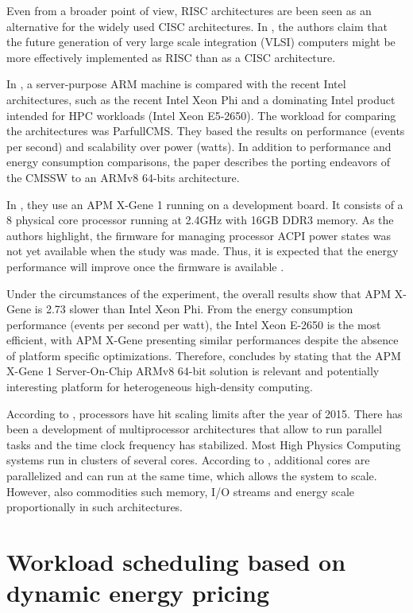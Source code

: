 Even from a broader point of view, RISC architectures are been seen as an alternative for the widely used CISC architectures. In \cite{RISC_CASE}, the authors claim that the future generation of very large scale integration (VLSI) computers might be more effectively implemented as RISC than as a CISC architecture.

In \cite{ACAT14ARMDAVID}, a server-purpose ARM machine is compared with the recent
Intel architectures, such as the recent Intel Xeon Phi and a dominating Intel product
intended for HPC workloads (Intel Xeon E5-2650). The workload for comparing
the architectures was ParfullCMS. They based the results on performance (events per
second) and scalability over power (watts). In addition to performance and energy
consumption comparisons, the paper describes the porting endeavors of the CMSSW to
an ARMv8 64-bits architecture.

In \cite{ACAT14ARMDAVID}, they use an APM X-Gene 1 running on a development board. 
It consists of a 8 physical core processor running at 2.4GHz with 16GB DDR3 memory.
As the authors highlight, the firmware for managing processor ACPI power states was
not yet available when the study was made. Thus, it is expected that the energy 
performance will improve once the firmware is available \cite{ACAT14ARMDAVID}.

Under the circumstances of the experiment, the overall results show that APM X-Gene 
is 2.73 slower than Intel Xeon Phi. From the energy consumption performance (events
per second per watt), the Intel Xeon E-2650 is the most efficient, with APM X-Gene
presenting similar performances despite the absence of platform specific 
optimizations. Therefore, \cite{ACAT14ARMDAVID} concludes by stating that the APM
X-Gene 1 Server-On-Chip ARMv8 64-bit solution is relevant and potentially interesting
platform for heterogeneous high-density computing. 

According to \cite{ACAT13ARM}, processors have hit scaling limits after the year of 2015. There has been a development of multiprocessor architectures that
allow to run parallel tasks and the time clock frequency has stabilized. Most High Physics Computing systems run in clusters of several cores. According to \cite{ACAT13ARM}, additional cores are parallelized and can run at the same time, which allows the system to scale. However, also commodities such memory, I/O streams and energy
scale proportionally in such architectures.




\section{Workload scheduling based on dynamic energy pricing}

